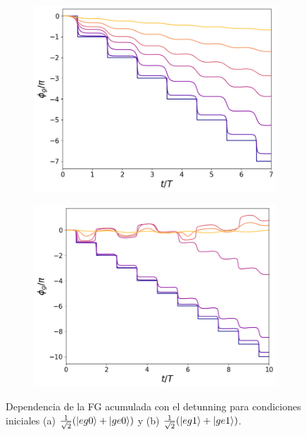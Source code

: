 \begin{figure}[h]
    \centering
    \begin{subfigure}{0.49\textwidth}
        \includegraphics[width=\textwidth]{figuras/ch5/dependencia/eg0+/detunning todo 0.png}
        \caption{}
        \label{fig5:dependencia detunning eg0}
    \end{subfigure}
    \hfill
    \begin{subfigure}{0.49\textwidth}
        \includegraphics[width=\textwidth]{figuras/ch5/dependencia/eg1+/detunning todo 0.png}
        \caption{}
        \label{fig5:dependencia detunning eg1}
    \end{subfigure}
    \caption{Dependencia de la FG acumulada con el detunning para condiciones iniciales (a) $\frac{1}{\sqrt{2}}(\ket{eg0}+\ket{ge0})$ y (b) $\frac{1}{\sqrt{2}}(\ket{eg1}+\ket{ge1})$.}
    \label{fig5:dependencia detunning}
\end{figure}
